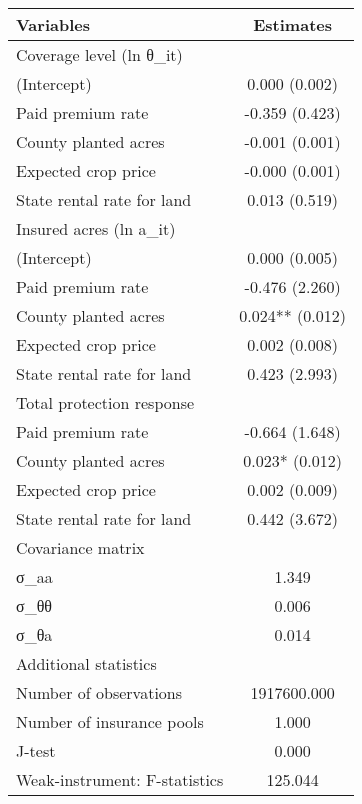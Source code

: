 \documentclass[
]{article}
\begin{document}
\begin{longtable}[]{@{}lc@{}}
\toprule\noalign{}
Variables & Estimates \\
\midrule\noalign{}
\endhead
\bottomrule\noalign{}
\endlastfoot
Coverage level (ln θ\_it) & \\
(Intercept) & 0.000 (0.002) \\
Paid premium rate & -0.359 (0.423) \\
County planted acres & -0.001 (0.001) \\
Expected crop price & -0.000 (0.001) \\
State rental rate for land & 0.013 (0.519) \\
Insured acres (ln a\_it) & \\
(Intercept) & 0.000 (0.005) \\
Paid premium rate & -0.476 (2.260) \\
County planted acres & 0.024** (0.012) \\
Expected crop price & 0.002 (0.008) \\
State rental rate for land & 0.423 (2.993) \\
Total protection response & \\
Paid premium rate & -0.664 (1.648) \\
County planted acres & 0.023* (0.012) \\
Expected crop price & 0.002 (0.009) \\
State rental rate for land & 0.442 (3.672) \\
Covariance matrix & \\
σ\_aa & 1.349 \\
σ\_θθ & 0.006 \\
σ\_θa & 0.014 \\
Additional statistics & \\
Number of observations & 1917600.000 \\
Number of insurance pools & 1.000 \\
J-test & 0.000 \\
Weak-instrument: F-statistics & 125.044 \\
\end{longtable}
\end{document}
